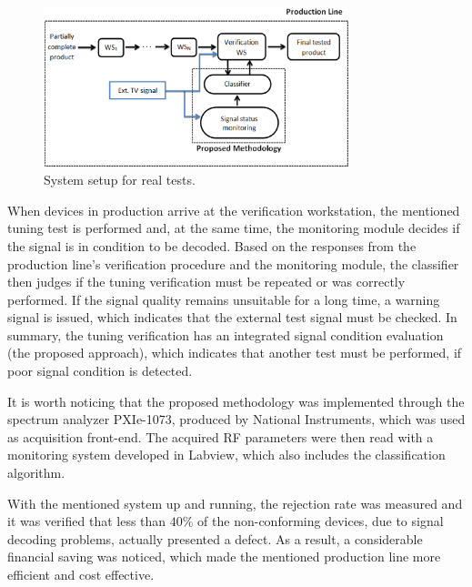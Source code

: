 \documentclass[conference]{IEEEtran}
\begin{document}
\begin{figure}[ht]
\centerline{\includegraphics[width=3.5in]{Fig1.eps}}
\caption{System setup for real tests.}
\label{figure:fig1}
\end{figure}

When devices in production arrive at the verification workstation, the mentioned tuning test is performed and, at the same time, the monitoring module decides if the signal is in condition to be decoded. Based on the responses from the production line's verification procedure and the monitoring module, the classifier then judges if the tuning verification must be repeated or was correctly performed. If the signal quality remains unsuitable for a long time, a warning signal is issued, which indicates that the external test signal must be checked. In summary, the tuning verification has an integrated signal condition evaluation  (the proposed approach), which indicates that another test must be performed, if poor signal condition is detected. 

It is worth noticing that the proposed methodology was implemented through the spectrum analyzer PXIe-1073, produced by National Instruments, which was used as acquisition front-end. The acquired RF parameters were then read with a monitoring system developed in Labview, which also includes the classification algorithm.

With the mentioned system up and running, the rejection rate was measured and it was verified that less than $40\%$ of the non-conforming devices, due to signal decoding problems, actually presented a defect. As a result, a considerable financial saving was noticed, which made the mentioned production line more efficient and cost effective.


%
%
\end{document}
